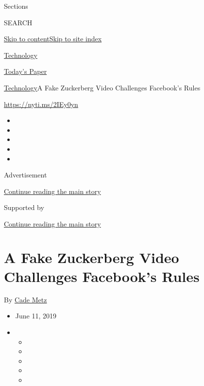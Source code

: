 Sections

SEARCH

\protect\hyperlink{site-content}{Skip to
content}\protect\hyperlink{site-index}{Skip to site index}

\href{https://www.nytimes.com/section/technology}{Technology}

\href{https://myaccount.nytimes.com/auth/login?response_type=cookie\&client_id=vi}{}

\href{https://www.nytimes.com/section/todayspaper}{Today's Paper}

\href{/section/technology}{Technology}\textbar{}A Fake Zuckerberg Video
Challenges Facebook's Rules

\href{https://nyti.ms/2IEy0yn}{https://nyti.ms/2IEy0yn}

\begin{itemize}
\item
\item
\item
\item
\item
\end{itemize}

Advertisement

\protect\hyperlink{after-top}{Continue reading the main story}

Supported by

\protect\hyperlink{after-sponsor}{Continue reading the main story}

\hypertarget{a-fake-zuckerberg-video-challenges-facebooks-rules}{%
\section{A Fake Zuckerberg Video Challenges Facebook's
Rules}\label{a-fake-zuckerberg-video-challenges-facebooks-rules}}

By \href{https://www.nytimes.com/by/cade-metz}{Cade Metz}

\begin{itemize}
\item
  June 11, 2019
\item
  \begin{itemize}
  \item
  \item
  \item
  \item
  \item
  \end{itemize}
\end{itemize}

